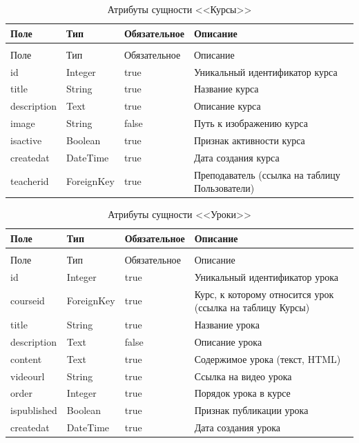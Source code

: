 \begin{xltabular}{\textwidth}{|l|l|p{3.2cm}|X|}
	\caption{Атрибуты сущности <<Курсы>>\label{courses:table}}\\ \hline
	Поле & Тип & Обязательное & Описание \\ \hline
	\endfirsthead
	\\ \hline
	Поле & Тип & Обязательное & Описание \\ \hline
	\endhead
	id & Integer & true & Уникальный идентификатор курса \\ \hline
	title & String & true & Название курса \\ \hline
	description & Text & true & Описание курса \\ \hline
	image & String & false & Путь к изображению курса \\ \hline
	isactive & Boolean & true & Признак активности курса \\ \hline
	createdat & DateTime & true & Дата создания курса \\ \hline
	teacherid & ForeignKey & true & Преподаватель (ссылка на таблицу Пользователи) \\ \hline
\end{xltabular}

\begin{xltabular}{\textwidth}{|l|l|p{3.2cm}|X|}
	\caption{Атрибуты сущности <<Уроки>>\label{lessons:table}}\\ \hline
	Поле & Тип & Обязательное & Описание \\ \hline
	\endfirsthead
	\\ \hline
	Поле & Тип & Обязательное & Описание \\ \hline
	\endhead
	id & Integer & true & Уникальный идентификатор урока \\ \hline
	courseid & ForeignKey & true & Курс, к которому относится урок (ссылка на таблицу Курсы) \\ \hline
	title & String & true & Название урока \\ \hline
	description & Text & false & Описание урока \\ \hline
	content & Text & true & Содержимое урока (текст, HTML) \\ \hline
	videourl & String & true & Ссылка на видео урока \\ \hline
	order & Integer & true & Порядок урока в курсе \\ \hline
	ispublished & Boolean & true & Признак публикации урока \\ \hline
	createdat & DateTime & true & Дата создания урока \\ \hline
\end{xltabular}


